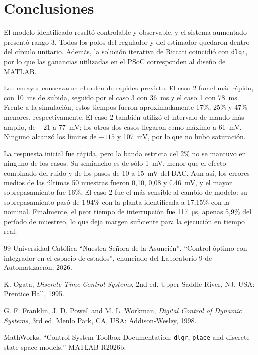\documentclass[conference]{IEEEtran}
\begin{document}
\FloatBarrier

\section{Conclusiones}
El modelo identificado resultó controlable y observable, y el sistema aumentado presentó rango 3. Todos los polos del regulador y del estimador quedaron dentro del círculo unitario. Además, la solución iterativa de Riccati coincidió con \texttt{dlqr}, por lo que las ganancias utilizadas en el PSoC corresponden al diseño de MATLAB.

Los ensayos conservaron el orden de rapidez previsto. El caso 2 fue el más rápido, con \SI{10}{ms} de subida, seguido por el caso 3 con \SI{36}{ms} y el caso 1 con \SI{78}{ms}. Frente a la simulación, estos tiempos fueron aproximadamente 17\%, 25\% y 47\% menores, respectivamente. El caso 2 también utilizó el intervalo de mando más amplio, de $-21$ a \SI{77}{mV}; los otros dos casos llegaron como máximo a \SI{61}{mV}. Ninguno alcanzó los límites de $-115$ y \SI{107}{mV}, por lo que no hubo saturación.

La respuesta inicial fue rápida, pero la banda estricta del 2\% no se mantuvo en ninguno de los casos. Su semiancho es de sólo \SI{1}{mV}, menor que el efecto combinado del ruido y de los pasos de 10 a \SI{15}{mV} del DAC. Aun así, los errores medios de las últimas 50 muestras fueron 0,10, 0,08 y \SI{0.46}{mV}, y el mayor sobrepasamiento fue 16\%. El caso 2 fue el más sensible al cambio de modelo: su sobrepasamiento pasó de 1,94\% con la planta identificada a 17,15\% con la nominal. Finalmente, el peor tiempo de interrupción fue \SI{117}{\micro s}, apenas 5,9\% del período de muestreo, lo que deja margen suficiente para la ejecución en tiempo real.

\begin{thebibliography}{99}
Universidad Católica ``Nuestra Señora de la Asunción'', ``Control óptimo con integrador en el espacio de estados'', enunciado del Laboratorio 9 de Automatización, 2026.

K. Ogata, \emph{Discrete-Time Control Systems}, 2nd ed. Upper Saddle River, NJ, USA: Prentice Hall, 1995.

G. F. Franklin, J. D. Powell and M. L. Workman, \emph{Digital Control of Dynamic Systems}, 3rd ed. Menlo Park, CA, USA: Addison-Wesley, 1998.

MathWorks, ``Control System Toolbox Documentation: \texttt{dlqr}, \texttt{place} and discrete state-space models,'' MATLAB R2026b.

\end{thebibliography}

\end{document}
